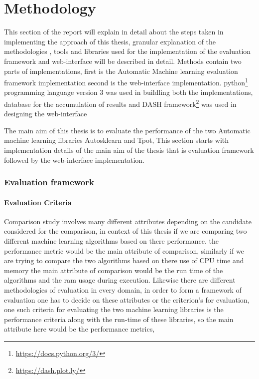 \chapter{Methodology}\label{chap:methods}

This section of the report will explain in detail about the steps taken in implementing the approach of this thesis, granular explanation of the methodologies , tools and libraries used for the implementation of the evaluation framework and web-interface will be described in detail. Methods contain two parts of  implementations, first is the Automatic Machine learning evaluation framework implementation second is the web-interface implementation. python\footnote{\url{https://docs.python.org/3/}} programming language version 3 was used in buildling both the implementations, database for the accumulation of results and DASH framework\footnote{\url{https://dash.plot.ly/}} was used in designing the web-interface

The main aim of this thesis is to evaluate the performance of the two Automatic machine learning libraries Autosklearn and Tpot, This section starts with implementation details of the main aim of the thesis that is evaluation framework followed by the web-interface implementation.

\subsection{Evaluation framework}

\subsubsection{Evaluation Criteria}
Comparison study involves many different attributes depending on the candidate considered for the comparison, in context of this thesis if we are comparing two different machine learning algorithms based on there performance. the performance metric would be the main attribute of comparison, similarly if we are trying to compare the two algorithms based on there use of CPU time and memory the main attribute of comparison would be the run time of the algorithms and the ram usage during execution. Likewise there are different methodologies of evaluation in every domain, in order to form a framework of evaluation one has to decide on these attributes or the criterion's for evaluation, one such criteria for evaluating the two machine learning libraries is the performance criteria along with the run-time of these libraries, so the main attribute here would be the performance metrics, 

